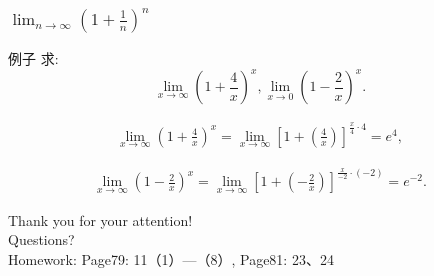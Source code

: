 \documentclass[
10pt,  
aspectratio=43,  
]{beamer}
\begin{document}
\begin{frame}
	\frametitle{$\lim_{n\to\infty}\left(1+\frac1n\right)^n$}
	\begin{exampleblock}{例子}
		求: $$
		\lim _{x \rightarrow \infty}\left(1+\frac{4}{x}\right)^x,   \lim _{x \rightarrow 0}\left(1-\frac{2}{x}\right)^x.
		$$
	\end{exampleblock}
	
	\begin{equation*}
		\begin{aligned}
			\lim _{x \rightarrow \infty}\left(1+\frac{4}{x}\right)^x=\lim _{x \rightarrow \infty}\left[1+\left(\frac{4}{x}\right)\right]^{\frac{x}{4}\cdot4}=e^{4}, 
		\end{aligned}
	\end{equation*}
	
	
	\begin{equation*}
		\begin{aligned}
			\lim _{x \rightarrow \infty}\left(1-\frac{2}{x}\right)^x=\lim _{x \rightarrow \infty}\left[1+\left(-\frac{2}{x}\right)\right]^{\frac{x}{-2} \cdot(-2)}=e^{-2}. 
		\end{aligned}
	\end{equation*}
\end{frame}



\begin{frame}[plain]
	\vfill
	\centering
	{
		\centering \Huge \color{white} Thank you for your attention!\\[10pt]Questions?\\Homework: Page79:  11（1）—（8）,   Page81:  23、24
	}
	\vfill
\end{frame}
\end{document}
